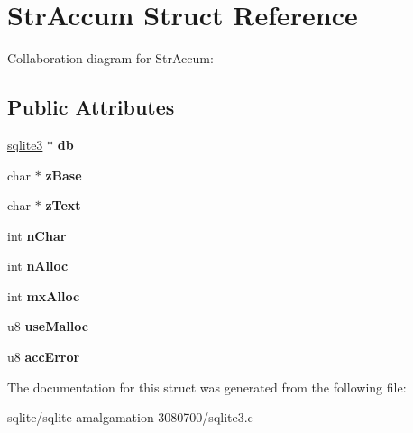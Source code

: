 \hypertarget{struct_str_accum}{\section{Str\+Accum Struct Reference}
\label{struct_str_accum}
}


Collaboration diagram for Str\+Accum\+:
\subsection*{Public Attributes}
\begin{DoxyCompactItemize}
\item 
\hypertarget{struct_str_accum_ade44091c9a91671c9457b9e4a98a9a5d}{\hyperlink{structsqlite3}{sqlite3} $\ast$ {\bfseries db}}\label{struct_str_accum_ade44091c9a91671c9457b9e4a98a9a5d}

\item 
\hypertarget{struct_str_accum_a5797e2f288573ee98a4025f0f96fe50d}{char $\ast$ {\bfseries z\+Base}}\label{struct_str_accum_a5797e2f288573ee98a4025f0f96fe50d}

\item 
\hypertarget{struct_str_accum_ac45a51cb7b85da2ae9865eac21d416dc}{char $\ast$ {\bfseries z\+Text}}\label{struct_str_accum_ac45a51cb7b85da2ae9865eac21d416dc}

\item 
\hypertarget{struct_str_accum_a88bf779588ca597a41fde3e41186e003}{int {\bfseries n\+Char}}\label{struct_str_accum_a88bf779588ca597a41fde3e41186e003}

\item 
\hypertarget{struct_str_accum_ae2f21c484b737b9903e695977c27815a}{int {\bfseries n\+Alloc}}\label{struct_str_accum_ae2f21c484b737b9903e695977c27815a}

\item 
\hypertarget{struct_str_accum_ab9985e4aabc65bebbf026881ce0b59bd}{int {\bfseries mx\+Alloc}}\label{struct_str_accum_ab9985e4aabc65bebbf026881ce0b59bd}

\item 
\hypertarget{struct_str_accum_abc135ceee2e63f41c101aceca5e9417b}{u8 {\bfseries use\+Malloc}}\label{struct_str_accum_abc135ceee2e63f41c101aceca5e9417b}

\item 
\hypertarget{struct_str_accum_a0ff9aa2eca1d5dc78692721e2a56dc1e}{u8 {\bfseries acc\+Error}}\label{struct_str_accum_a0ff9aa2eca1d5dc78692721e2a56dc1e}

\end{DoxyCompactItemize}


The documentation for this struct was generated from the following file\+:\begin{DoxyCompactItemize}
\item 
sqlite/sqlite-\/amalgamation-\/3080700/sqlite3.\+c\end{DoxyCompactItemize}
